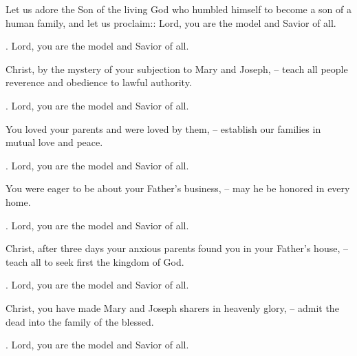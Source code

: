 \lettrine[loversize=0.15,lines=2]{L}{}et us adore the Son of the living God who humbled himself to become a son of a human family, and let us proclaim::
Lord, you are the model and Savior of all.
\par \Rbar. Lord, you are the model and Savior of all.

Christ, by the mystery of your subjection to Mary and Joseph,
– teach all people reverence and obedience to lawful authority.
\par \Rbar. Lord, you are the model and Savior of all.

You loved your parents and were loved by them,
– establish our families in mutual love and peace.
\par \Rbar. Lord, you are the model and Savior of all.

You were eager to be about your Father’s business,
– may he be honored in every home.
\par \Rbar. Lord, you are the model and Savior of all.

Christ, after three days your anxious parents found you in your Father’s house,
– teach all to seek first the kingdom of God.
\par \Rbar. Lord, you are the model and Savior of all.

Christ, you have made Mary and Joseph sharers in heavenly glory,
– admit the dead into the family of the blessed.
\par \Rbar. Lord, you are the model and Savior of all.
